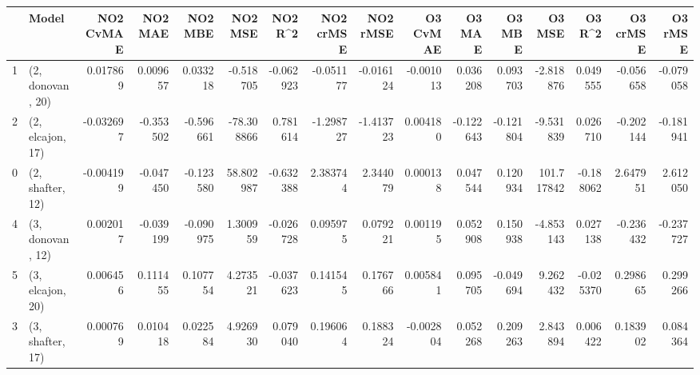 \begin{tabular}{llrrrrrrrrrrrrrr}
\toprule
{} &             Model &  NO2 CvMAE &   NO2 MAE &   NO2 MBE &    NO2 MSE &   NO2 R\textasciicircum2 &  NO2 crMSE &  NO2 rMSE &  O3 CvMAE &    O3 MAE &    O3 MBE &      O3 MSE &    O3 R\textasciicircum2 &  O3 crMSE &   O3 rMSE \\
\midrule
1 &  (2, donovan, 20) &   0.017869 &  0.009657 &  0.033218 &  -0.518705 & -0.062923 &  -0.051177 & -0.016124 & -0.001013 &  0.036208 &  0.093703 &   -2.818876 &  0.049555 & -0.056658 & -0.079058 \\
2 &  (2, elcajon, 17) &  -0.032697 & -0.353502 & -0.596661 & -78.308866 &  0.781614 &  -1.298727 & -1.413723 &  0.004180 & -0.122643 & -0.121804 &   -9.531839 &  0.026710 & -0.202144 & -0.181941 \\
0 &  (2, shafter, 12) &  -0.004199 & -0.047450 & -0.123580 &  58.802987 & -0.632388 &   2.383744 &  2.344079 &  0.000138 &  0.047544 &  0.120934 &  101.717842 & -0.188062 &  2.647951 &  2.612050 \\
4 &  (3, donovan, 12) &   0.002017 & -0.039199 & -0.090975 &   1.300959 & -0.026728 &   0.095975 &  0.079221 &  0.001195 &  0.052908 &  0.150938 &   -4.853143 &  0.027138 & -0.236432 & -0.237727 \\
5 &  (3, elcajon, 20) &   0.006456 &  0.111455 &  0.107754 &   4.273521 & -0.037623 &   0.141545 &  0.176766 &  0.005841 &  0.095705 & -0.049694 &    9.262432 & -0.025370 &  0.298665 &  0.299266 \\
3 &  (3, shafter, 17) &   0.000769 &  0.010418 &  0.022584 &   4.926930 &  0.079040 &   0.196064 &  0.188324 & -0.002804 &  0.052268 &  0.209263 &    2.843894 &  0.006422 &  0.183902 &  0.084364 \\
\bottomrule
\end{tabular}
